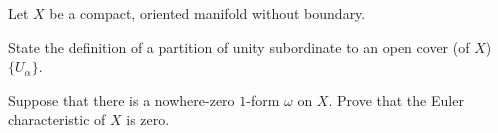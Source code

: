 Let $X$ be a compact, oriented manifold without boundary.
\begin{alist}
\item State the definition of a partition of unity subordinate to an
open cover (of $X$) $\{U_{\alpha}\}$.
\item Suppose that there is a nowhere-zero $1$-form $\omega$ on
$X$. Prove that the Euler characteristic of $X$ is zero.
\end{alist}
